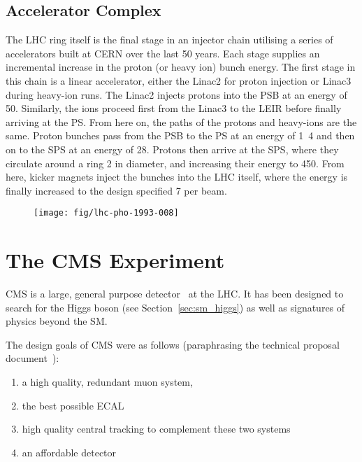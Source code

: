 \subsection{Accelerator Complex}
The \ac{LHC} ring itself is the final stage in an injector chain utilising a
series of accelerators built at CERN over the last 50 years. Each stage supplies
an incremental increase in the proton (or heavy ion) bunch energy. The first
stage in this chain is a linear accelerator, either the Linac2 for proton
injection or Linac3 during heavy-ion runs. The Linac2 injects protons into the
\ac{PSB} at an energy of \unit{50}{\mega\electronvolt}. Similarly, the ions
proceed first from the Linac3 to the \ac{LEIR} before finally arriving at the
\ac{PS}. From here on, the paths of the protons and heavy-ions are the
same. Proton bunches pass from the \ac{PSB} to the \ac{PS} at an energy of
\unit{1.4}{\giga\electronvolt} and then on to the \ac{SPS} at an energy of
\unit{28}{\giga\electronvolt}. Protons then arrive at the \ac{SPS}, where they
circulate around a ring \unit{2}{\kilo\metre} in diameter, and increasing their
energy to \unit{450}{\giga\electronvolt}. From here, kicker magnets inject the
bunches into the \ac{LHC} itself, where the energy is finally increased to the
design specified \unit{7}{\TeV} per beam.
\begin{figure}
\texttt{[image: fig/lhc-pho-1993-008]}
\end{figure}




\section{The \acl{CMS} Experiment}
\label{sec:cms}
\ac{CMS} is a large, general purpose detector~\cite{cms_jinst} at the
\ac{LHC}. It has been designed to search for the Higgs boson (see
Section~\ref{sec:sm_higgs}) as well as signatures of physics beyond the \ac{SM}.

The design goals of CMS were as follows (paraphrasing the technical proposal
document~\cite{cms_technical_proposal}):
\begin{enumerate}
\item a high quality, redundant muon system,
\item the best possible \ac{ECAL}
\item high quality central tracking to complement these two systems
\item an affordable detector
\end{enumerate}

